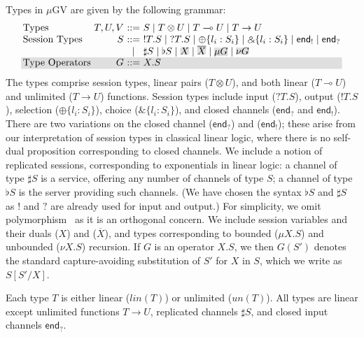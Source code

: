 \documentclass[orivec,envcountsame]{llncs}
\newcommand{\with}{\mathbin\binampersand}
\newcommand{\gvdual}[1]{\overline{#1}}
\newcommand{\gvout}[2]{{!#1.#2}}
\newcommand{\gvin}[2]{{?#1.#2}}
\newcommand{\lto}{\ensuremath{\multimap}}
\newcommand{\uto}{\ensuremath{\rightarrow}}
\newcommand{\outterm}{\mkwd{end}_!}
\newcommand{\interm}{\mkwd{end}_?}
\newcommand{\gvserver}[1]{\flat #1}
\newcommand{\gvservice}[1]{\sharp #1}
\newcommand{\mkwd}[1]{\mathsf{#1}}
\newcommand{\un}{un}
\newcommand{\lin}{lin}
\newcommand{\mugv}{$\mu\mathrm{GV}$\xspace}
\newcommand\shade[1]{\setlength{\fboxsep}{0pt}\colorbox{shade}{\ensuremath{#1}}}
\newcommand\shaderow{\noalign{\vskip-0.4pt}\rowcolor{shade}[0.6mm]}
\begin{document}
Types in \mugv are given by the following grammar:
\small
\[
\begin{array}{@{}l@{~}r@{~}c@{~}l@{}}
  \text{Types}         & T,U,V & ::= & S \mid T \otimes U \mid T \lto U \mid T \uto U \\
  \text{Session Types} & S     & ::= & \gvout{T}{S} \mid \gvin{T}{S}
                                \mid   \oplus \{ l_i : S_i \} \mid \with \{ l_i : S_i \}
                                \mid   \outterm \mid \interm \\
                            & & \mid & \gvservice{S} \mid \gvserver{S}
                                \mid   \shade{X} \mid \shade{\gvdual{X}}
                                \mid   \shade{\mu G} \mid \shade{\nu G} \\  \shaderow
  \text{Type Operators} & G    & ::= & X.S \\
\end{array}
\]\normalsize%
%
The types comprise session types, linear pairs ($T \otimes U$), and both linear ($T \lto U$) and
unlimited ($T \uto U$) functions.
%
Session types include input ($\gvin{T}{S}$), output ($\gvout{T}{S}$), selection ($\oplus\{ l_i:S_i
\}$), choice ($\with\{l_i:S_i\}$), and closed channels ($\interm$ and $\outterm$). There are two
variations on the closed channel ($\interm$) and ($\outterm$); these arise from our interpretation
of session types in classical linear logic, where there is no self-dual proposition corresponding to
closed channels.  We include a notion of replicated sessions, corresponding to exponentials in
linear logic: a channel of type $\gvservice{S}$ is a service, offering any number of channels of
type $S$; a channel of type $\gvserver{S}$ is the server providing such channels. (We have chosen
the syntax $\gvserver{S}$ and $\gvservice{S}$ as $!$ and $?$ are already used for input and output.)
%
For simplicity, we omit polymorphism~\citep{LindleyM14} as it is an orthogonal concern.
%
We include session variables and their duals ($X$) and ($\gvdual{X}$), and types corresponding to
bounded ($\mu X.S$) and unbounded ($\nu X.S$) recursion. If $G$ is an operator $X.S$, we then
$G(S')$ denotes the standard capture-avoiding substitution of $S'$ for $X$ in $S$, which we write as
$S[S'/X]$.

Each type $T$ is either linear ($\lin(T)$) or unlimited ($\un(T)$).
All types are linear except unlimited functions $T \uto U$, replicated channels $\gvservice{S}$, and
closed input channels $\interm$.
\end{document}
